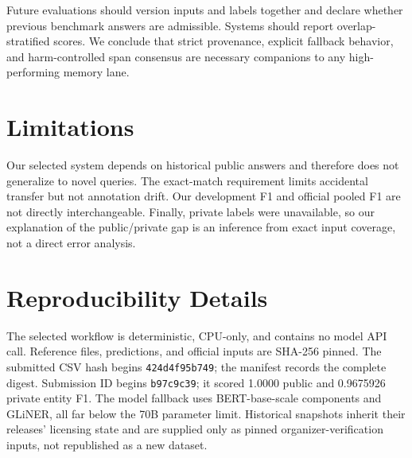 \documentclass[11pt]{article}
\begin{document}
Future evaluations should version inputs and labels together and declare whether previous benchmark answers are admissible. Systems should report overlap-stratified scores. We conclude that strict provenance, explicit fallback behavior, and harm-controlled span consensus are necessary companions to any high-performing memory lane.

\section*{Limitations}
Our selected system depends on historical public answers and therefore does not generalize to novel queries. The exact-match requirement limits accidental transfer but not annotation drift. Our development F1 and official pooled F1 are not directly interchangeable. Finally, private labels were unavailable, so our explanation of the public/private gap is an inference from exact input coverage, not a direct error analysis.

\clearpage


\appendix
\section{Reproducibility Details}
The selected workflow is deterministic, CPU-only, and contains no model API call. Reference files, predictions, and official inputs are SHA-256 pinned. The submitted CSV hash begins \texttt{424d4f95b749}; the manifest records the complete digest. Submission ID begins \texttt{b97c9c39}; it scored 1.0000 public and 0.9675926 private entity F1. The model fallback uses BERT-base-scale components and GLiNER, all far below the 70B parameter limit. Historical snapshots inherit their releases' licensing state and are supplied only as pinned organizer-verification inputs, not republished as a new dataset.
\end{document}
